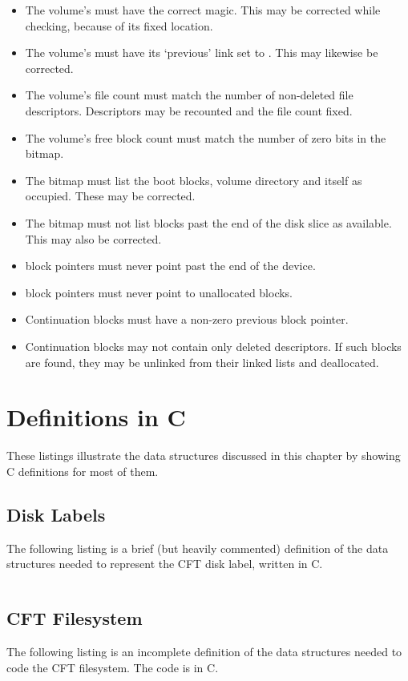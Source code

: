 \begin{itemize}
  \item The volume's  must have the correct magic. This may be
    corrected while checking, because of its fixed location.
  \item The volume's  must have its ‘previous’ link set to
    . This may likewise be corrected.
  \item The volume's file count must match the number of non-deleted file
    descriptors. Descriptors may be recounted and the file count fixed.
  \item The volume's free block count must match the number of zero bits in the
    bitmap.
  \item The bitmap must list the boot blocks, volume directory and itself as
    occupied. These may be corrected.
  \item The bitmap must not list blocks past the end of the disk slice as
    available. This may also be corrected.
  \item \glspl{block pointer} must never point past the end of the device.
  \item \glspl{block pointer} must never point to unallocated blocks.
  \item Continuation blocks must have a non-zero previous \gls{block pointer}.
  \item Continuation blocks may not contain only deleted descriptors. If such
    blocks are found, they may be unlinked from their linked lists and
    deallocated.
\end{itemize}

\section{Definitions in C}

These listings illustrate the data structures discussed in this chapter by
showing C definitions for most of them.

\subsection{Disk Labels}

The following listing is a brief (but heavily commented) definition of the data
structures needed to represent the CFT disk label, written in C.

\inputminted{c}{../../../experiments/cftslice.h}
\pagebreak

\subsection{CFT Filesystem}

The following listing is an incomplete definition of the data structures needed to
code the CFT filesystem. The code is in C.


%
